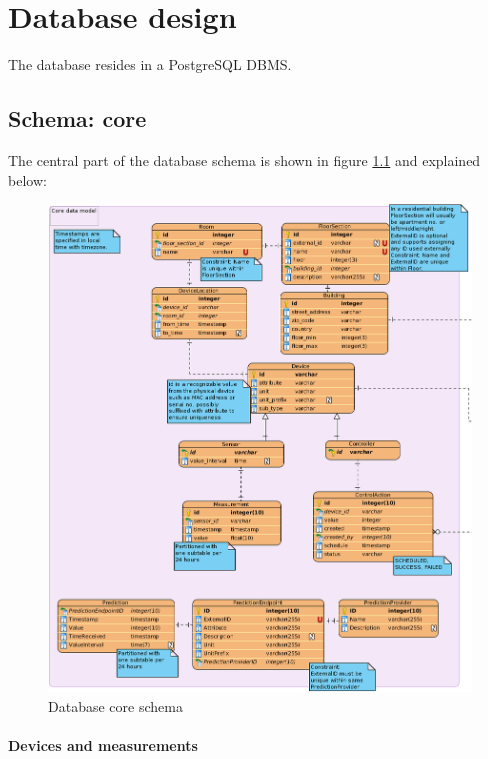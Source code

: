
\chapter{Database design}\label{ch:db_design}



The database resides in a PostgreSQL DBMS.

\section{Schema: core}
The central part of the database schema is shown in figure \ref{figureDbCoreModel} and explained below:

\begin{figure}[H]
    \centering
    \includegraphics[width=\textwidth]{figures/db_core_schema}
    \caption{Database core schema}
    \label{figureDbCoreModel}
\end{figure}

\subsubsection{Devices and measurements}


